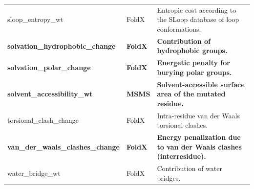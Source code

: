 \begin{table}[tb]
\begin{tabular}{ l | l | p{7cm} }
		sloop\_entropy\_wt                        & FoldX            & Entropic cost according to the SLoop database of loop conformations.                                                  \\
		\textbf{solvation\_hydrophobic\_change}   & \textbf{FoldX}   & \textbf{Contribution of hydrophobic groups.}                                                                          \\
		\textbf{solvation\_polar\_change}         & \textbf{FoldX}   & \textbf{Energetic penalty for burying polar groups.}                                                                  \\
		\textbf{solvent\_accessibility\_wt}       & \textbf{MSMS}    & \textbf{Solvent-accessible surface area of the mutated residue.}                                                      \\
		torsional\_clash\_change                  & FoldX            & Intra-residue van der Waals torsional clashes.                                                                        \\
		\textbf{van\_der\_waals\_clashes\_change} & \textbf{FoldX}   & \textbf{Energy penalization due to van der Waals clashes (interresidue).}                                             \\
		water\_bridge\_wt                         & FoldX            & Contribution of water bridges.                                                                                        \\
		\bottomrule
	\end{tabular}
\end{table}

